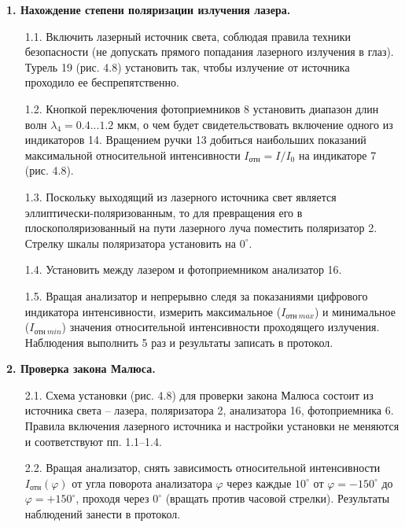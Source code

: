 \textbf{1. Нахождение степени поляризации излучения лазера.}
\begin{enumerate}
    \item[1.1.] Включить лазерный источник света, соблюдая правила техники безопасности (не допускать прямого попадания лазерного излучения в глаз). Турель 19 (рис. 4.8) установить так, чтобы излучение от источника проходило ее беспрепятственно.
    \item[1.2.] Кнопкой переключения фотоприемников 8 установить диапазон длин волн $\lambda_4 = 0.4...1.2$ мкм, о чем будет свидетельствовать включение одного из индикаторов 14. Вращением ручки 13 добиться наибольших показаний максимальной относительной интенсивности $I_{\text{отн}} = I/I_0$ на индикаторе 7 (рис. 4.8).
    \item[1.3.] Поскольку выходящий из лазерного источника свет является эллиптически-поляризованным, то для превращения его в плоскополяризованный на пути лазерного луча поместить поляризатор 2. Стрелку шкалы поляризатора установить на $0^\circ$.
    \item[1.4.] Установить между лазером и фотоприемником анализатор 16.
    \item[1.5.] Вращая анализатор и непрерывно следя за показаниями цифрового индикатора интенсивности, измерить максимальное ($I_{\text{отн}\ max}$) и минимальное ($I_{\text{отн}\ min}$) значения относительной интенсивности проходящего излучения. Наблюдения выполнить 5 раз и результаты записать в протокол.
\end{enumerate}

\textbf{2. Проверка закона Малюса.}
\begin{enumerate}
    \item[2.1.] Схема установки (рис. 4.8) для проверки закона Малюса состоит из источника света -- лазера, поляризатора 2, анализатора 16, фотоприемника 6. Правила включения лазерного источника и настройки установки не меняются и соответствуют пп. 1.1--1.4.
    \item[2.2.] Вращая анализатор, снять зависимость относительной интенсивности $I_\text{отн}(\varphi)$ от угла поворота анализатора $\varphi$ через каждые $10^\circ$ от $\varphi = -150^\circ$ до $\varphi = +150^\circ$, проходя через $0^\circ$ (вращать против часовой стрелки). Результаты наблюдений занести в протокол.
\end{enumerate}

